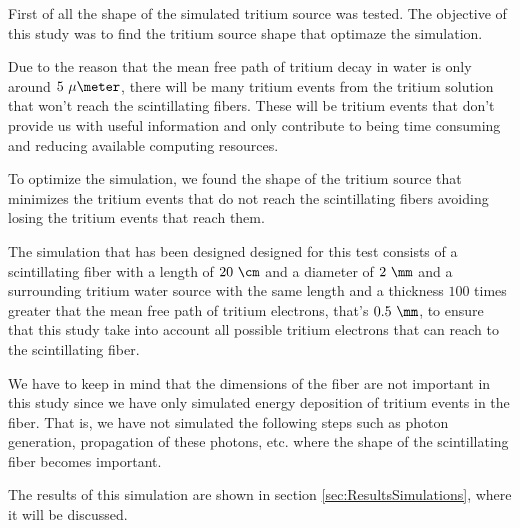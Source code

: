 First of all the shape of the simulated tritium source  was tested. The objective of this study was to find the tritium source shape that optimaze the simulation. 

Due to the reason that the mean free path of tritium decay in water is only around $5~\mu\meter$, there will be many tritium events from the tritium solution that won't reach the scintillating fibers. These will be tritium events that don't provide us with useful information and only contribute to being time consuming and reducing available computing resources.

To optimize the simulation, we found the shape of the tritium source that minimizes the tritium events that do not reach the scintillating fibers avoiding losing the tritium events that reach them.

The simulation that has been designed designed for this test consists of a scintillating fiber with a length of $20~\cm$ and a diameter of $2~\mm$ and a surrounding tritium water source with the same length and a thickness $100$ times greater that the mean free path of tritium electrons, that's $0.5~\mm$, to ensure that this study take into account all possible tritium electrons that can reach to the scintillating fiber. 

We have to keep in mind that the dimensions of the fiber are not important in this study since we have only simulated energy deposition of tritium events in the fiber. That is, we have not simulated the following steps such as photon generation, propagation of these photons, etc. where the shape of the scintillating fiber becomes important.


The results of this simulation are shown in section \ref{sec:ResultsSimulations}, where it will be discussed.

